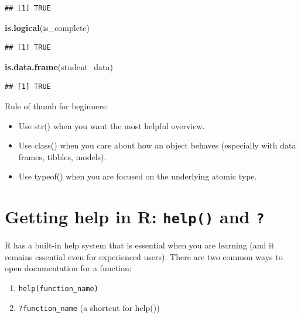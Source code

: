 \documentclass[
  11pt,
]{article}
\newenvironment{Shaded}{\begin{snugshade}}{\end{snugshade}}
\newcommand{\FunctionTok}[1]{\textcolor[rgb]{0.13,0.29,0.53}{\textbf{#1}}}
\newcommand{\NormalTok}[1]{#1}
\providecommand{\tightlist}{%
  \setlength{\itemsep}{0pt}\setlength{\parskip}{0pt}}
\begin{document}
\begin{verbatim}
## [1] TRUE
\end{verbatim}

\begin{Shaded}
\begin{Highlighting}[]
\FunctionTok{is.logical}\NormalTok{(is\_complete)}
\end{Highlighting}
\end{Shaded}

\begin{verbatim}
## [1] TRUE
\end{verbatim}

\begin{Shaded}
\begin{Highlighting}[]
\FunctionTok{is.data.frame}\NormalTok{(student\_data)}
\end{Highlighting}
\end{Shaded}

\begin{verbatim}
## [1] TRUE
\end{verbatim}

Rule of thumb for beginners:

\begin{itemize}
\tightlist
\item
  Use str() when you want the most helpful overview.
\item
  Use class() when you care about how an object behaves (especially with
  data frames, tibbles, models).
\item
  Use typeof() when you are focused on the underlying atomic type.
\end{itemize}

\section{\texorpdfstring{Getting help in R: \texttt{help()} and
\texttt{?}}{Getting help in R: help() and ?}}\label{getting-help-in-r-help-and}

R has a built-in help system that is essential when you are learning
(and it remains essential even for experienced users). There are two
common ways to open documentation for a function:

\begin{enumerate}
\def\labelenumi{\arabic{enumi}.}
\tightlist
\item
  \texttt{help(function\_name)}
\item
  \texttt{?function\_name} (a shortcut for help())
\end{enumerate}
\end{document}
